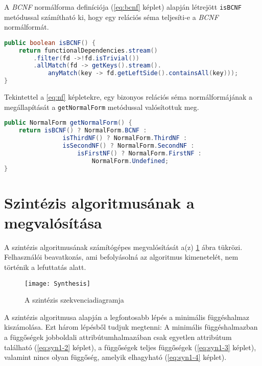 A \textit{BCNF} normálforma definíciója (\ref{eq:bcnf} képlet) alapján létrejött \lstinline{isBCNF} metódussal számítható ki, hogy egy relációs séma teljesíti-e a \textit{BCNF} normálformát.

\linespread{1}
\begin{lstlisting}[language=Java]
public boolean isBCNF() {
	return functionalDependencies.stream()
		.filter(fd ->!fd.isTrivial())
		.allMatch(fd -> getKeys().stream().
			anyMatch(key -> fd.getLeftSide().containsAll(key)));
}
\end{lstlisting}

Tekintettel a \ref{eq:nf} képletekre, egy bizonyos relációs séma normálformájának a megállapítását a \lstinline{getNormalForm} metódussal valósítottuk meg.

\linespread{1}
\begin{lstlisting}[language=Java]
public NormalForm getNormalForm() {
	return isBCNF() ? NormalForm.BCNF :
     			isThirdNF() ? NormalForm.ThirdNF :
				isSecondNF() ? NormalForm.SecondNF :
					isFirstNF() ? NormalForm.FirstNF : 
						NormalForm.Undefined;
}
\end{lstlisting}

\section{Szintézis algoritmusának a megvalósítása}

A szintézis algoritmusának számítógépes megvalósítását a(z) \ref{fig:synseq} ábra tükrözi. Felhasználói beavatkozás, ami befolyásolná az algoritmus kimenetelét, nem történik a lefuttatás alatt.

\begin{figure}
    \centering
    \texttt{[image: Synthesis]}
    \caption{A szintézis szekvenciadiagramja}
    \label{fig:synseq}
\end{figure}

A szintézis algoritmusa alapján a legfontosabb lépés a minimális függéshalmaz kiszámolása. Ezt három lépésből tudjuk megtenni: A minimális függéshalmazban a függőségek jobboldali attribútumhalmazában csak egyetlen attribútum található (\ref{eq:syn1-2} képlet), a függőségek teljes függőségek (\ref{eq:syn1-3} képlet), valamint nincs olyan függőség, amelyik elhagyható (\ref{eq:syn1-4} képlet).

